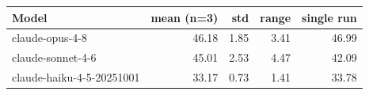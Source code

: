\begin{tabular}{lrrrr}
\toprule
Model & mean (n=3) & std & range & single run \\
\midrule
claude-opus-4-8 & 46.18 & 1.85 & 3.41 & 46.99 \\
claude-sonnet-4-6 & 45.01 & 2.53 & 4.47 & 42.09 \\
claude-haiku-4-5-20251001 & 33.17 & 0.73 & 1.41 & 33.78 \\
\bottomrule
\end{tabular}
